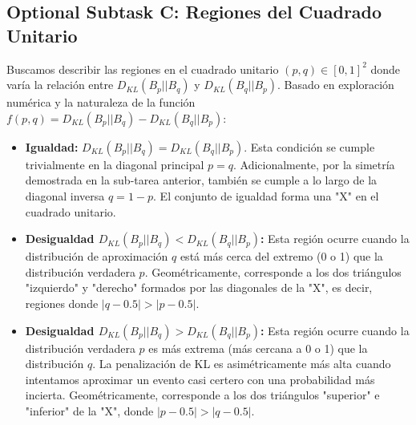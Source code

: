 \documentclass[12pt]{article}
\begin{document}
\subsection*{Optional Subtask C: Regiones del Cuadrado Unitario}
Buscamos describir las regiones en el cuadrado unitario $(p,q) \in [0,1]^2$ donde varía la relación entre $D_{KL}(B_p || B_q)$ y $D_{KL}(B_q || B_p)$.
Basado en exploración numérica y la naturaleza de la función $f(p,q) = D_{KL}(B_p || B_q) - D_{KL}(B_q || B_p)$:
\begin{itemize}
    \item \textbf{Igualdad:} $D_{KL}(B_p || B_q) = D_{KL}(B_q || B_p)$. 
    Esta condición se cumple trivialmente en la diagonal principal $p = q$. Adicionalmente, por la simetría demostrada en la sub-tarea anterior, también se cumple a lo largo de la diagonal inversa $q = 1 - p$. El conjunto de igualdad forma una "X" en el cuadrado unitario.
    \item \textbf{Desigualdad $D_{KL}(B_p || B_q) < D_{KL}(B_q || B_p)$:}
    Esta región ocurre cuando la distribución de aproximación $q$ está más cerca del extremo (0 o 1) que la distribución verdadera $p$. Geométricamente, corresponde a los dos triángulos "izquierdo" y "derecho" formados por las diagonales de la "X", es decir, regiones donde $|q - 0.5| > |p - 0.5|$.
    \item \textbf{Desigualdad $D_{KL}(B_p || B_q) > D_{KL}(B_q || B_p)$:}
    Esta región ocurre cuando la distribución verdadera $p$ es más extrema (más cercana a 0 o 1) que la distribución $q$. La penalización de KL es asimétricamente más alta cuando intentamos aproximar un evento casi certero con una probabilidad más incierta. Geométricamente, corresponde a los dos triángulos "superior" e "inferior" de la "X", donde $|p - 0.5| > |q - 0.5|$.
\end{itemize}
\end{document}
